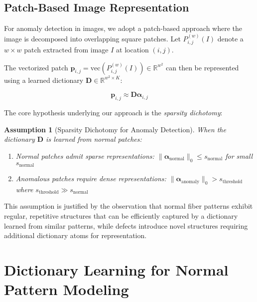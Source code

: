 \documentclass[12pt]{article}
\newcommand{\dictionary}{\mathbf{D}}
\newcommand{\patch}{\mathbf{p}}
\newcommand{\coeff}{\boldsymbol{\alpha}}
\newtheorem{assumption}[theorem]{Assumption}
\begin{document}
\subsection{Patch-Based Image Representation}
\label{subsec:patch_representation}

For anomaly detection in images, we adopt a patch-based approach where the image is decomposed into overlapping square patches. Let $P_{i,j}^{(w)}(I)$ denote a $w \times w$ patch extracted from image $I$ at location $(i,j)$.

The vectorized patch $\patch_{i,j} = \text{vec}(P_{i,j}^{(w)}(I)) \in \mathbb{R}^{w^2}$ can then be represented using a learned dictionary $\dictionary \in \mathbb{R}^{w^2 \times K}$:

\begin{equation}
    \label{eq:patch_representation}
    \patch_{i,j} \approx \dictionary \coeff_{i,j}
\end{equation}

The core hypothesis underlying our approach is the \textit{sparsity dichotomy}:

\begin{assumption}[Sparsity Dichotomy for Anomaly Detection]
    \label{ass:sparsity_dichotomy}
    When the dictionary $\dictionary$ is learned from normal patches:
    \begin{enumerate}
        \item Normal patches admit sparse representations: $\|\coeff_{\text{normal}}\|_0 \leq s_{\text{normal}}$ for small $s_{\text{normal}}$
        \item Anomalous patches require dense representations: $\|\coeff_{\text{anomaly}}\|_0 > s_{\text{threshold}}$ where $s_{\text{threshold}} \gg s_{\text{normal}}$
    \end{enumerate}
\end{assumption}

This assumption is justified by the observation that normal fiber patterns exhibit regular, repetitive structures that can be efficiently captured by a dictionary learned from similar patterns, while defects introduce novel structures requiring additional dictionary atoms for representation.

\newpage

\section{Dictionary Learning for Normal Pattern Modeling}
\label{sec:dictionary_learning}
\end{document}
